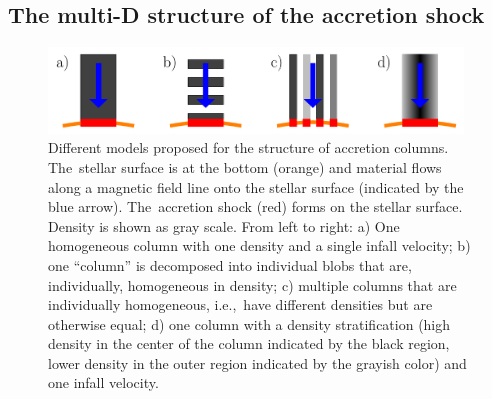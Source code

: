 \subsection{The multi-D structure of the accretion shock}

\begin{figure}[t]
    \centering
    \includegraphics[width=11cm]{sketches/column_sketch.pdf}
    \caption{Different models proposed for the 
    structure of accretion columns. The~stellar surface is at the bottom (orange) and 
    material flows along a magnetic field line onto the stellar surface (indicated 
    by the blue arrow). The~accretion shock (red) forms on the stellar surface. 
    Density is shown as gray scale. From left to right: 
    a) One homogeneous column with one density and a single infall velocity; 
    b) one ``column'' is decomposed into individual blobs that are, individually, homogeneous in density;
    c) multiple columns that are individually homogeneous, i.e.,~have different densities but are otherwise equal; 
    d) one column with a density stratification (high density in the center of the column indicated by the black region, lower density in the outer region indicated by the grayish color) and one infall velocity. 
    }
    \label{fig:column}
\end{figure}

